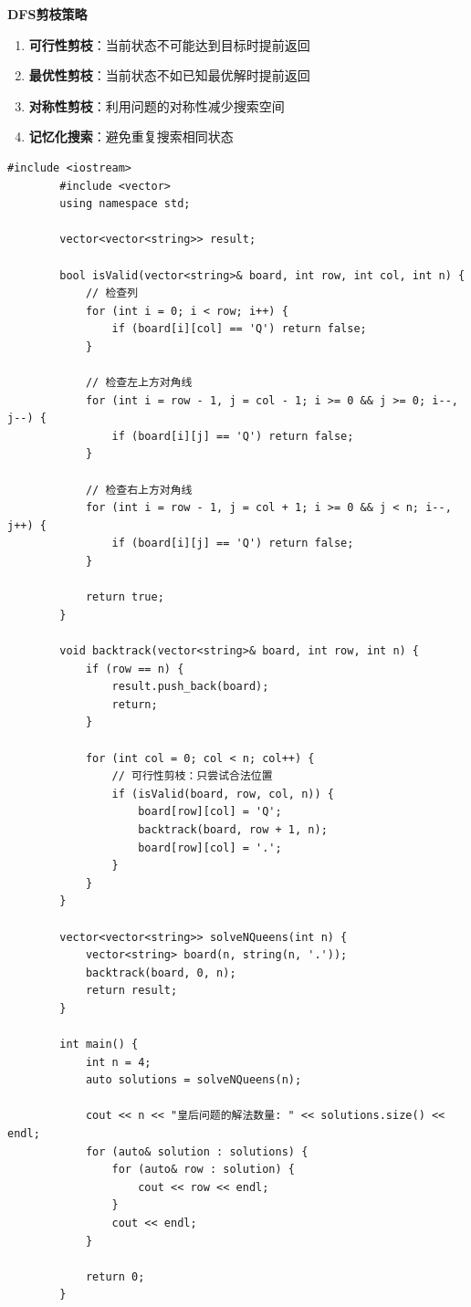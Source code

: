 \documentclass[12pt,a4paper]{article}
\begin{document}
	\begin{bluebox}
		\textbf{DFS剪枝策略}
		
		\begin{enumerate}
			\item \textbf{可行性剪枝}：当前状态不可能达到目标时提前返回
			\item \textbf{最优性剪枝}：当前状态不如已知最优解时提前返回
			\item \textbf{对称性剪枝}：利用问题的对称性减少搜索空间
			\item \textbf{记忆化搜索}：避免重复搜索相同状态
		\end{enumerate}
	\end{bluebox}
	
	\begin{lstlisting}[caption={DFS剪枝示例：N皇后问题}]
		#include <iostream>
		#include <vector>
		using namespace std;
		
		vector<vector<string>> result;
		
		bool isValid(vector<string>& board, int row, int col, int n) {
			// 检查列
			for (int i = 0; i < row; i++) {
				if (board[i][col] == 'Q') return false;
			}
			
			// 检查左上方对角线
			for (int i = row - 1, j = col - 1; i >= 0 && j >= 0; i--, j--) {
				if (board[i][j] == 'Q') return false;
			}
			
			// 检查右上方对角线
			for (int i = row - 1, j = col + 1; i >= 0 && j < n; i--, j++) {
				if (board[i][j] == 'Q') return false;
			}
			
			return true;
		}
		
		void backtrack(vector<string>& board, int row, int n) {
			if (row == n) {
				result.push_back(board);
				return;
			}
			
			for (int col = 0; col < n; col++) {
				// 可行性剪枝：只尝试合法位置
				if (isValid(board, row, col, n)) {
					board[row][col] = 'Q';
					backtrack(board, row + 1, n);
					board[row][col] = '.';
				}
			}
		}
		
		vector<vector<string>> solveNQueens(int n) {
			vector<string> board(n, string(n, '.'));
			backtrack(board, 0, n);
			return result;
		}
		
		int main() {
			int n = 4;
			auto solutions = solveNQueens(n);
			
			cout << n << "皇后问题的解法数量: " << solutions.size() << endl;
			for (auto& solution : solutions) {
				for (auto& row : solution) {
					cout << row << endl;
				}
				cout << endl;
			}
			
			return 0;
		}
	\end{lstlisting}
	
\end{document}
